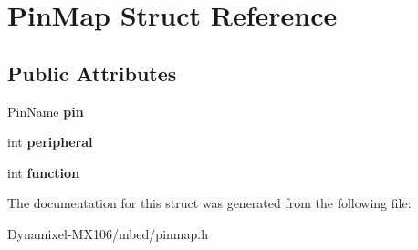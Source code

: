 \hypertarget{struct_pin_map}{}\section{Pin\+Map Struct Reference}
\label{struct_pin_map}
\subsection*{Public Attributes}
\begin{DoxyCompactItemize}
\item 
Pin\+Name {\bfseries pin}\hypertarget{struct_pin_map_a86114430d2d44af0912d6568879191a0}{}\label{struct_pin_map_a86114430d2d44af0912d6568879191a0}

\item 
int {\bfseries peripheral}\hypertarget{struct_pin_map_aff228d741b54c3680ec5c4b92160e1c7}{}\label{struct_pin_map_aff228d741b54c3680ec5c4b92160e1c7}

\item 
int {\bfseries function}\hypertarget{struct_pin_map_ad687defa2b4b2f7cf455677b5806bd82}{}\label{struct_pin_map_ad687defa2b4b2f7cf455677b5806bd82}

\end{DoxyCompactItemize}


The documentation for this struct was generated from the following file\+:\begin{DoxyCompactItemize}
\item 
Dynamixel-\/\+M\+X106/mbed/pinmap.\+h\end{DoxyCompactItemize}
